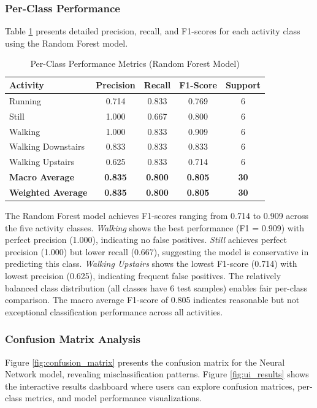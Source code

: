 \subsubsection{Per-Class Performance}
Table \ref{tab:perclass_metrics} presents detailed precision, recall, and F1-scores for each activity class using the Random Forest model.

\begin{table}[H]
    \centering
    \caption{Per-Class Performance Metrics (Random Forest Model)}
    \begin{tabular}{@{}lcccc@{}}
        \toprule
        Activity & Precision & Recall & F1-Score & Support \\ 
        \midrule
        Running & 0.714 & 0.833 & 0.769 & 6 \\
        Still & 1.000 & 0.667 & 0.800 & 6 \\
        Walking & 1.000 & 0.833 & 0.909 & 6 \\
        Walking Downstairs & 0.833 & 0.833 & 0.833 & 6 \\
        Walking Upstairs & 0.625 & 0.833 & 0.714 & 6 \\
        \midrule
        \textbf{Macro Average} & \textbf{0.835} & \textbf{0.800} & \textbf{0.805} & \textbf{30} \\
        \textbf{Weighted Average} & \textbf{0.835} & \textbf{0.800} & \textbf{0.805} & \textbf{30} \\
        \bottomrule
    \end{tabular}
    \label{tab:perclass_metrics}
\end{table}

The Random Forest model achieves F1-scores ranging from 0.714 to 0.909 across the five activity classes. \textit{Walking} shows the best performance (F1 = 0.909) with perfect precision (1.000), indicating no false positives. \textit{Still} achieves perfect precision (1.000) but lower recall (0.667), suggesting the model is conservative in predicting this class. \textit{Walking Upstairs} shows the lowest F1-score (0.714) with lowest precision (0.625), indicating frequent false positives. The relatively balanced class distribution (all classes have 6 test samples) enables fair per-class comparison. The macro average F1-score of 0.805 indicates reasonable but not exceptional classification performance across all activities.

\subsubsection{Confusion Matrix Analysis}
Figure \ref{fig:confusion_matrix} presents the confusion matrix for the Neural Network model, revealing misclassification patterns. Figure \ref{fig:ui_results} shows the interactive results dashboard where users can explore confusion matrices, per-class metrics, and model performance visualizations.

